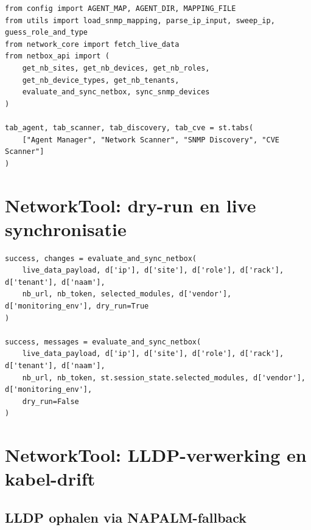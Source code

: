 \begin{listing}[H]
  \caption[NetworkTool: module-imports en tabstructuur]{NetworkTool: module-imports en tabstructuur (\S\ref{sec:architectuur})}
  \label{lst:networktool-gui-tabs-full}
  \begin{verbatim}
from config import AGENT_MAP, AGENT_DIR, MAPPING_FILE
from utils import load_snmp_mapping, parse_ip_input, sweep_ip, guess_role_and_type
from network_core import fetch_live_data
from netbox_api import (
    get_nb_sites, get_nb_devices, get_nb_roles,
    get_nb_device_types, get_nb_tenants,
    evaluate_and_sync_netbox, sync_snmp_devices
)

tab_agent, tab_scanner, tab_discovery, tab_cve = st.tabs(
    ["Agent Manager", "Network Scanner", "SNMP Discovery", "CVE Scanner"]
)
  \end{verbatim}
\end{listing}

\section{NetworkTool: dry-run en live synchronisatie}
\label{sec:bijlage-networktool-sync}

\begin{listing}[H]
  \caption[NetworkTool: dry-run gevolgd door live synchronisatie]{NetworkTool: dry-run-analyse gevolgd door live synchronisatie (\S\ref{sec:schaalbaarheid})}
  \label{lst:networktool-dryrun-live}
  \begin{verbatim}
success, changes = evaluate_and_sync_netbox(
    live_data_payload, d['ip'], d['site'], d['role'], d['rack'], d['tenant'], d['naam'],
    nb_url, nb_token, selected_modules, d['vendor'], d['monitoring_env'], dry_run=True
)

success, messages = evaluate_and_sync_netbox(
    live_data_payload, d['ip'], d['site'], d['role'], d['rack'], d['tenant'], d['naam'],
    nb_url, nb_token, st.session_state.selected_modules, d['vendor'], d['monitoring_env'],
    dry_run=False
)
  \end{verbatim}
\end{listing}

\section{NetworkTool: LLDP-verwerking en kabel-drift}
\label{sec:bijlage-networktool-lldp}

\subsection{LLDP ophalen via NAPALM-fallback}

